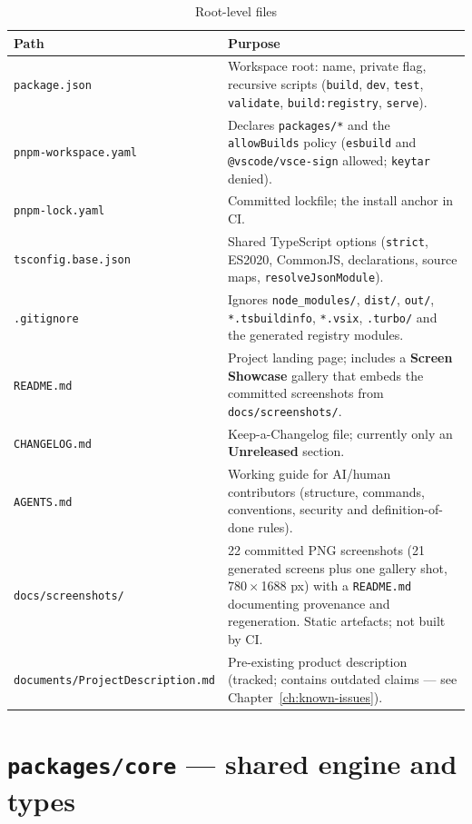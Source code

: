 \begin{longtable}{p{5cm}p{9.4cm}}
\caption{Root-level files}\\
\toprule
\textbf{Path} & \textbf{Purpose} \\
\midrule

\texttt{package.json} & Workspace root: name, private flag, recursive scripts
(\texttt{build}, \texttt{dev}, \texttt{test}, \texttt{validate},
\texttt{build:registry}, \texttt{serve}). \\
\texttt{pnpm-workspace.yaml} & Declares \texttt{packages/*} and the
\texttt{allowBuilds} policy (\texttt{esbuild} and
\texttt{@vscode/vsce-sign} allowed; \texttt{keytar} denied). \\
\texttt{pnpm-lock.yaml} & Committed lockfile; the install anchor in CI. \\
\texttt{tsconfig.base.json} & Shared TypeScript options (\texttt{strict},
ES2020, CommonJS, declarations, source maps, \texttt{resolveJsonModule}). \\
\texttt{.gitignore} & Ignores \texttt{node\_modules/}, \texttt{dist/},
\texttt{out/}, \texttt{*.tsbuildinfo}, \texttt{*.vsix}, \texttt{.turbo/} and the
generated registry modules. \\
\texttt{README.md} & Project landing page; includes a \textbf{Screen Showcase}
gallery that embeds the committed screenshots from \texttt{docs/screenshots/}. \\
\texttt{CHANGELOG.md} & Keep-a-Changelog file; currently only an
\textbf{Unreleased} section. \\
\texttt{AGENTS.md} & Working guide for AI/human contributors (structure,
commands, conventions, security and definition-of-done rules). \\
\texttt{docs/screenshots/} & 22 committed PNG screenshots (21 generated screens
plus one gallery shot, 780\,$\times$\,1688 px) with a \texttt{README.md}
documenting provenance and regeneration. Static artefacts; not built by CI. \\
\texttt{documents/ProjectDescription.md} & Pre-existing product description
(tracked; contains outdated claims --- see Chapter~\ref{ch:known-issues}). \\
\bottomrule
\end{longtable}

\section{\texttt{packages/core} --- shared engine and types}


